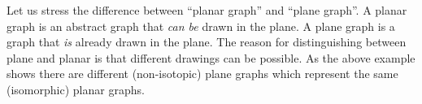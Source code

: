 \begin{rem}
Let us stress the difference between ``planar graph'' and ``plane graph''.
A planar graph is an abstract graph that \emph{can be} drawn in the plane.
A plane graph is a graph that \emph{is} already drawn in the plane.
The reason for distinguishing between plane and planar is that different drawings can be possible.
As the above example shows there are different (non-isotopic) plane graphs which represent the same (isomorphic) planar graphs.
\end{rem}